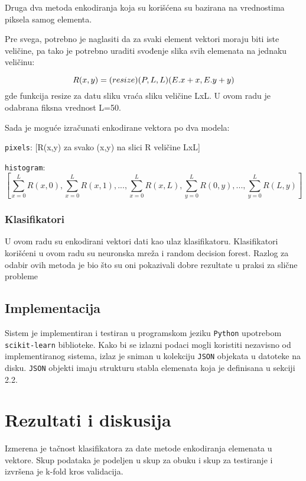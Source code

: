 \documentclass[]{amsart}
\begin{document}
Druga dva metoda enkodiranja koja su korišćena su bazirana na vrednostima piksela samog elementa.

Pre svega, potrebno je naglasiti da za svaki element vektori moraju biti iste veličine, pa tako je potrebno uraditi svođenje slika svih elemenata
na jednaku veličinu:

$$ R(x,y) = \text(resize)(P, L, L)(E.x + x, E.y + y) $$ gde funkcija resize za datu sliku vraća sliku veličine LxL. U ovom radu je odabrana fiksna vrednost L=50.

Sada je moguće izračunati enkodirane vektora po dva modela:

\texttt{pixels}: [R(x,y) za svako (x,y) na slici R veličine LxL]

\texttt{histogram}: $$ [\sum_{x=0}^L R(x, 0), \sum_{x=0}^L R(x, 1), ..., \sum_{x=0}^L R(x, L), \sum_{y=0}^L R(0, y), ...,  \sum_{y=0}^L R(L, y)] $$

\subsubsection{Klasifikatori}
\label{sec:org0ef63da}

U ovom radu su enkodirani vektori dati kao ulaz klasifikatoru. Klasifikatori korišćeni u ovom radu su neuronska mreža i random decision forest. Razlog za
odabir ovih metoda je bio što su oni pokazivali dobre rezultate u praksi za slične probleme \cite{bitew2018logical} \cite{he2017extracting}

\subsection{Implementacija}
\label{sec:orgf94d64a}

Sistem je implementiran i testiran u programskom jeziku \texttt{Python} upotrebom \texttt{scikit-learn} biblioteke. Kako bi se izlazni podaci mogli koristiti nezavisno od
implementiranog sistema, izlaz je sniman u kolekciju \texttt{JSON} objekata u datoteke na disku. \texttt{JSON} objekti imaju strukturu stabla elemenata koja je definisana u
sekciji 2.2.

\section{Rezultati i diskusija}
\label{sec:orga78d38e}


Izmerena je tačnost klasifikatora za date metode enkodiranja elemenata u vektore. Skup podataka je podeljen u skup za obuku i skup za testiranje
i izvršena je k-fold kros validacija. 
\end{document}
